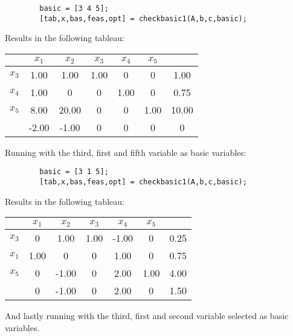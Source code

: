 \documentclass{article}
\begin{document}
    \begin{lstlisting}
        basic = [3 4 5];
        [tab,x,bas,feas,opt] = checkbasic1(A,b,c,basic);
    \end{lstlisting}

    Results in the following tableau:

    \begin{center}
        \begin{tabular}{ | c | c c c c c | c | }
            \hline
                   & $x_1$ & $x_2$ & $x_3$ & $x_4$ & $x_5$ &  \\
            \hline
            $x_3$ & 1.00  & 1.00   & 1.00 & 0   &  0   & 1.00  \\
            $x_4$ & 1.00  & 0      & 0    & 1.00&  0   & 0.75 \\
            $x_5$ & 8.00  & 20.00  & 0    & 0   &  1.00& 10.00 \\
            \hline
                  & -2.00  & -1.00  & 0    & 0   &  0   & 0 \\
            \hline
        \end{tabular}
    \end{center}

    Running with the third, first and fifth variable as basic variables:

    \begin{lstlisting}
        basic = [3 1 5];
        [tab,x,bas,feas,opt] = checkbasic1(A,b,c,basic);
    \end{lstlisting}

    Results in the following tableau:

    \begin{center}
        \begin{tabular}{ | c | c c c c c | c | }
            \hline
                   & $x_1$ & $x_2$ & $x_3$ & $x_4$ & $x_5$ &  \\
            \hline
            $x_3$ & 0  & 1.00   & 1.00 & -1.00   &  0   & 0.25  \\
            $x_1$ & 1.00  & 0      & 0    & 1.00&  0   & 0.75 \\
            $x_5$ & 0  & -1.00  & 0    & 2.00  & 1.00 & 4.00 \\
            \hline
                  & 0  & -1.00  & 0    & 2.00   &  0   & 1.50 \\
            \hline
        \end{tabular}
    \end{center}

    And lastly running with the third, first and second variable selected as
    basic variables.
\end{document}
